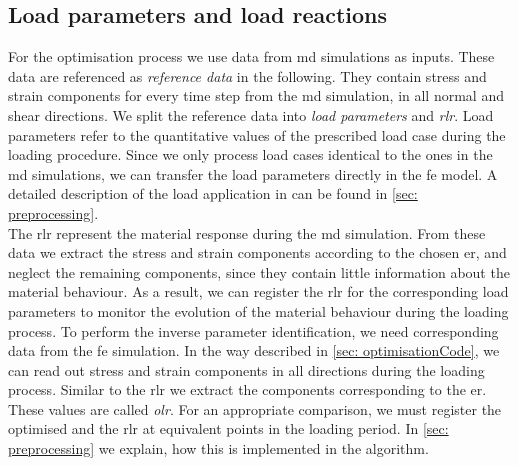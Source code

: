 \subsection{Load parameters and load reactions}\label{subsec:loadParameters}
For the optimisation process we use data from \acrshort{md} simulations as inputs.
These data are referenced as \emph{reference data} in the following. They contain stress and strain components for every time step from the \acrshort{md} simulation, in all normal and shear directions.
We split the reference data into \emph{load parameters} and \emph{\acrlong{rlr}}.
Load parameters refer to the quantitative values of the prescribed load case during the loading procedure.
Since we only process load cases identical to the ones in the \acrshort{md} simulations, we can transfer the load parameters directly in the \acrshort{fe} model.
A detailed description of the load application in  can be found in \autoref{sec: preprocessing}. \\
\indent The \acrlong{rlr} represent the material response during the \acrshort{md} simulation.
From these data we extract the stress and strain components according to the chosen \acrlong{er}, and neglect the remaining components, since they contain little information about the material behaviour.
As a result, we can register the \acrlong{rlr} for the corresponding load parameters to monitor the evolution of the material behaviour during the loading process.
To perform the inverse parameter identification, we need corresponding data from the \acrshort{fe} simulation.
In the way described in \autoref{sec: optimisationCode}, we can read out stress and strain components in all directions during the loading process.
Similar to the \acrlong{rlr} we extract the components corresponding to the \acrlong{er}.
These values are called \emph{\acrlong{olr}}. 
For an appropriate comparison, we must register the optimised and the \acrlong{rlr} at equivalent points in the loading period.
In \autoref{sec: preprocessing} we explain, how this is implemented in the algorithm.

